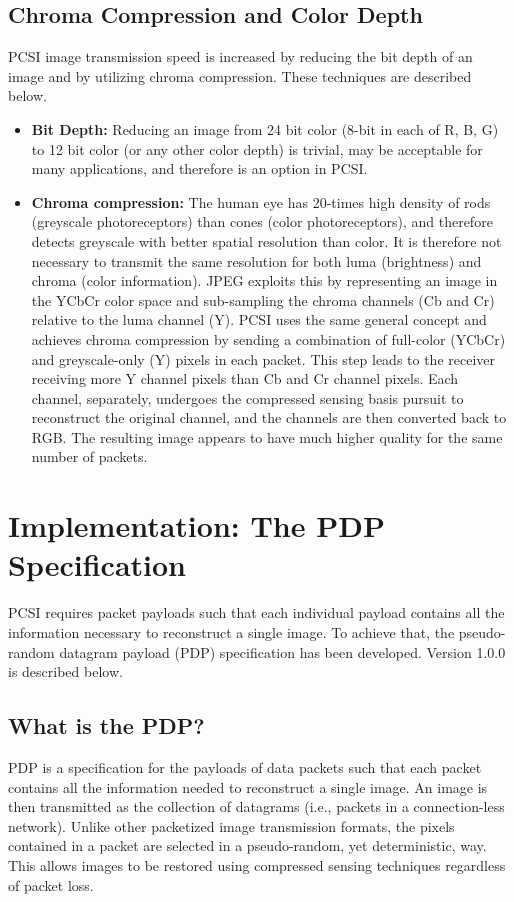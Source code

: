 \documentclass[letterpaper]{article}
\begin{document}
\subsection{Chroma Compression and Color Depth}
PCSI image transmission speed is increased by reducing the bit depth of an image and by utilizing chroma compression. These techniques are described below.
\begin{itemize}
    \item \textbf{Bit Depth:} Reducing an image from 24 bit color (8-bit in each of R, B, G) to 12 bit color (or any other color depth) is trivial, may be acceptable for many applications, and therefore is an option in PCSI.
    \item \textbf{Chroma compression:} The human eye has 20-times high density of rods (greyscale photoreceptors) than cones (color photoreceptors), and therefore detects greyscale with better spatial resolution than color. It is therefore not necessary to transmit the same resolution for both luma (brightness) and chroma (color information). JPEG exploits this by representing an image in the YCbCr color space and sub-sampling the chroma channels (Cb and Cr) relative to the luma channel (Y). PCSI uses the same general concept and achieves chroma compression by sending a combination of full-color (YCbCr) and greyscale-only (Y) pixels in each packet. This step leads to the receiver receiving more Y channel pixels than Cb and Cr channel pixels. Each channel, separately, undergoes the compressed sensing basis pursuit to reconstruct the original channel, and the channels are then converted back to RGB. The resulting image appears to have much higher quality for the same number of packets.
\end{itemize}

\section{Implementation: The PDP Specification}
PCSI requires packet payloads such that each individual payload contains all the information necessary to reconstruct a single image. To achieve that, the pseudo-random datagram payload (PDP) specification has been developed. Version 1.0.0 is described below.

\subsection{What is the PDP?}
PDP is a specification for the payloads of data packets such that each packet contains all the information needed to reconstruct a single image. An image is then transmitted as the collection of datagrams (i.e., packets in a connection-less network). Unlike other packetized image transmission formats, the pixels contained in a packet are selected in a pseudo-random, yet deterministic, way. This allows images to be restored using compressed sensing techniques regardless of packet loss. 
\end{document}
